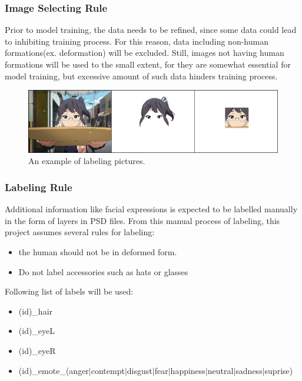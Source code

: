 \documentclass{article}
\begin{document}
\subsubsection{Image Selecting Rule}
Prior to model training, the data needs to be refined, since some data could lead to inhibiting training process. For this reason, data including non-human formations(ex. deformation) will be excluded. Still, images not having human formations will be used to the small extent, for they are somewhat essential for model training, but excessive amount of such data hinders training process.

\begin{figure}[ht]
\vskip 0.2in
\begin{center}
\centerline{\includegraphics[width=\columnwidth]{labeling.png}}
\caption{An example of labeling pictures.}
\label{icml-historical}
\end{center}
\vskip -0.2in
\end{figure}

\subsubsection{Labeling Rule}

Additional information like facial expressions is expected to be labelled manually in the form of layers in PSD files. From this manual process of labeling, this project assumes several rules for labeling:
\begin{itemize}
\item the human should not be in deformed form.
\item Do not label accessories such as hats or glasses \newline
\end{itemize}

Following list of labels will be used:
\begin{itemize}
\item (id)\_hair
\item (id)\_eyeL
\item (id)\_eyeR
\item (id)\_emote\_(anger$|$contempt$|$disgust$|$fear\newline$|$happiness$|$neutral$|$sadness$|$suprise)
\end{itemize}
\end{document}
